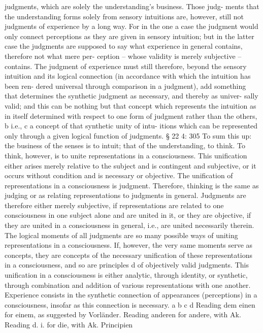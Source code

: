 judgments, which are solely the understanding’s business. Those judg-
ments that the understanding forms solely from sensory intuitions are,
however, still not judgments of experience by a long way. For in the one a
case the judgment would only connect perceptions as they are given in
sensory intuition; but in the latter case the judgments are supposed to
say what experience in general contains, therefore not what mere per-
ception – whose validity is merely subjective – contains. The judgment
of experience must still therefore, beyond the sensory intuition and its
logical connection (in accordance with which the intuition has been ren-
dered universal through comparison in a judgment), add something that
determines the synthetic judgment as necessary, and thereby as univer-
sally valid; and this can be nothing but that concept which represents the
intuition as in itself determined with respect to one form of judgment
rather than the others, b i.e., c a concept of that synthetic unity of intu-
itions which can be represented only through a given logical function of
judgments.
§ 22
4: 305
To sum this up: the business of the senses is to intuit; that of the
understanding, to think. To think, however, is to unite representations
in a consciousness. This uniﬁcation either arises merely relative to the
subject and is contingent and subjective, or it occurs without condition
and is necessary or objective. The uniﬁcation of representations in a
consciousness is judgment. Therefore, thinking is the same as judging
or as relating representations to judgments in general. Judgments are
therefore either merely subjective, if representations are related to
one consciousness in one subject alone and are united in it, or they
are objective, if they are united in a consciousness in general, i.e., are
united necessarily therein. The logical moments of all judgments are
so many possible ways of uniting representations in a consciousness. If,
however, the very same moments serve as concepts, they are concepts
of the necessary uniﬁcation of these representations in a consciousness,
and so are principles d of objectively valid judgments. This uniﬁcation
in a consciousness is either analytic, through identity, or synthetic,
through combination and addition of various representations with one
another. Experience consists in the synthetic connection of appearances
(perceptions) in a consciousness, insofar as this connection is necessary.
a
b
c
d
Reading dem einen for einem, as suggested by Vorländer.
Reading anderen for andere, with Ak.
Reading d. i. for die, with Ak.
Principien
